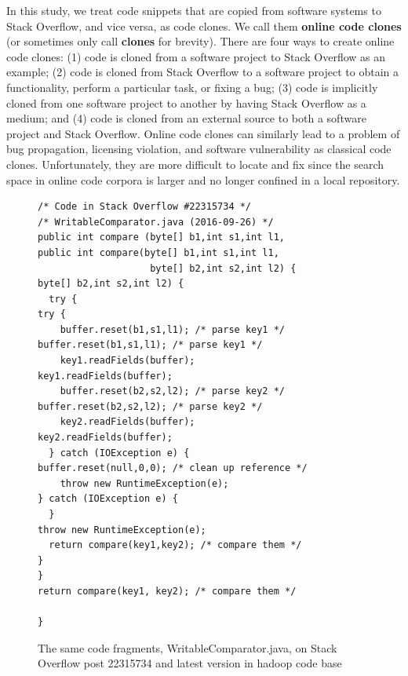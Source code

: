 \documentclass{sig-alternate-05-2015}
\begin{document}

In this study, we treat code snippets that are copied from software systems to Stack Overflow, and vice versa, as code clones. We call them \textbf{online code clones} (or sometimes only call \textbf{clones} for brevity). There are four ways to create online code clones: (1) code is cloned from a software project to Stack Overflow as an example; (2) code is cloned from Stack Overflow to a software project to obtain a functionality, perform a particular task, or fixing a bug; (3) code is implicitly cloned from one software project to another by having Stack Overflow as a medium; and (4) code is cloned from an external source to both a software project and Stack Overflow. Online code clones can similarly lead to a problem of bug propagation, licensing violation, and software vulnerability as classical code clones. Unfortunately, they are more difficult to locate and fix since the search space in online code corpora is larger and no longer confined in a local repository.

\begin{figure}
	\begin{lstlisting}
/* Code in Stack Overflow #22315734 */                    /* WritableComparator.java (2016-09-26) */
public int compare (byte[] b1,int s1,int l1,              public int compare(byte[] b1,int s1,int l1,
                    byte[] b2,int s2,int l2) {                               byte[] b2,int s2,int l2) {
  try {                                                     try {
    buffer.reset(b1,s1,l1); /* parse key1 */                  buffer.reset(b1,s1,l1); /* parse key1 */
    key1.readFields(buffer);                                  key1.readFields(buffer);
    buffer.reset(b2,s2,l2); /* parse key2 */                  buffer.reset(b2,s2,l2); /* parse key2 */
    key2.readFields(buffer);                                  key2.readFields(buffer);
  } catch (IOException e) {                                   buffer.reset(null,0,0); /* clean up reference */
    throw new RuntimeException(e);                          } catch (IOException e) {
  }                                                           throw new RuntimeException(e);
  return compare(key1,key2); /* compare them */             }
}                                                           return compare(key1, key2); /* compare them */
	                                                        }
	\end{lstlisting}
	\caption{The same code fragments, WritableComparator.java, on Stack Overflow post 22315734 and latest version in hadoop code base}
	\label{fig:before-after}
\end{figure}
\end{document}
